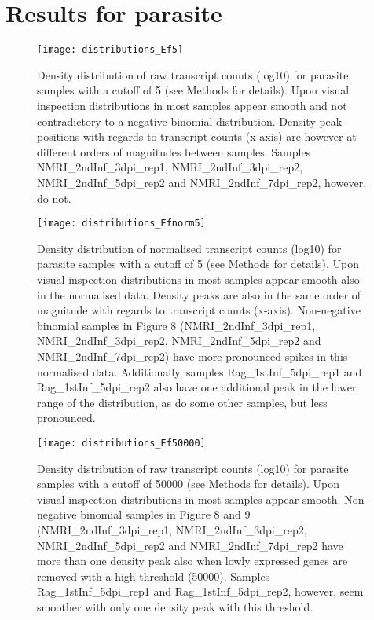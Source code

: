 \documentclass{article}
\begin{document}
\section{Results for parasite}

\begin{figure}[h]
\begin{center}
\texttt{[image: distributions\_Ef5]} %
\caption{Density distribution of raw transcript counts (log10) for parasite samples with a cutoff of 5 (see Methods for details). Upon visual inspection distributions in most samples appear smooth and not contradictory to a negative binomial distribution. Density peak positions with regards to transcript counts (x-axis) are however at different orders of magnitudes between samples. Samples NMRI\_2ndInf\_3dpi\_rep1, NMRI\_2ndInf\_3dpi\_rep2, NMRI\_2ndInf\_5dpi\_rep2 and NMRI\_2ndInf\_7dpi\_rep2, however, do not.}
\end{center}
\end{figure}

\begin{figure}[h]
\begin{center}
\texttt{[image: distributions\_Efnorm5]} %
\caption{Density distribution of normalised transcript counts (log10) for parasite samples with a cutoff of 5 (see Methods for details). Upon visual inspection distributions in most samples appear smooth also in the normalised data. Density peaks are also in the same order of magnitude with regards to transcript counts (x-axis). Non-negative binomial samples in Figure 8 (NMRI\_2ndInf\_3dpi\_rep1, NMRI\_2ndInf\_3dpi\_rep2, NMRI\_2ndInf\_5dpi\_rep2 and NMRI\_2ndInf\_7dpi\_rep2) have more pronounced spikes in this normalised data. Additionally, samples Rag\_1stInf\_5dpi\_rep1 and Rag\_1stInf\_5dpi\_rep2 also have one additional peak in the lower range of the distribution, as do some other samples, but less pronounced.}
\end{center}
\end{figure}

\begin{figure}[h]
\begin{center}
\texttt{[image: distributions\_Ef50000]} %
\caption{Density distribution of raw transcript counts (log10) for parasite samples with a cutoff of 50000 (see Methods for details). Upon visual inspection distributions in most samples appear smooth. Non-negative binomial samples in Figure 8 and 9 (NMRI\_2ndInf\_3dpi\_rep1, NMRI\_2ndInf\_3dpi\_rep2, NMRI\_2ndInf\_5dpi\_rep2 and NMRI\_2ndInf\_7dpi\_rep2 have more than one density peak also when lowly expressed genes are removed with a high threshold (50000). Samples Rag\_1stInf\_5dpi\_rep1 and Rag\_1stInf\_5dpi\_rep2, however, seem smoother with only one density peak with this threshold.}
\end{center}
\end{figure}
\end{document}
